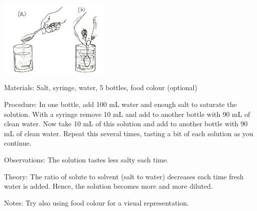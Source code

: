 \begin{multicols}{2}
\begin{center}
\includegraphics[width=0.4\textwidth]{./img/source/dilution.jpg}
\end{center}

\begin{description*}
\item[Materials:]{Salt, syringe, water, 5 bottles, food colour (optional)}
\item[Procedure:]{In one bottle, add 100 mL water and enough salt to saturate the solution. With a syringe remove 10 mL and add to another bottle with 90 mL of clean water. Now take 10 mL of this solution and add to another bottle with 90 mL of clean water. Repeat this several times, tasting a bit of each solution as you continue.}
\item[Observations:]{The solution tastes less salty each time.}
\item[Theory:]{The ratio of solute to solvent (salt to water) decreases each time fresh water is added. Hence, the solution becomes more and more diluted.}
\item[Notes:]{Try also using food colour for a visual representation.}
\end{description*}

%
%


\end{multicols}


